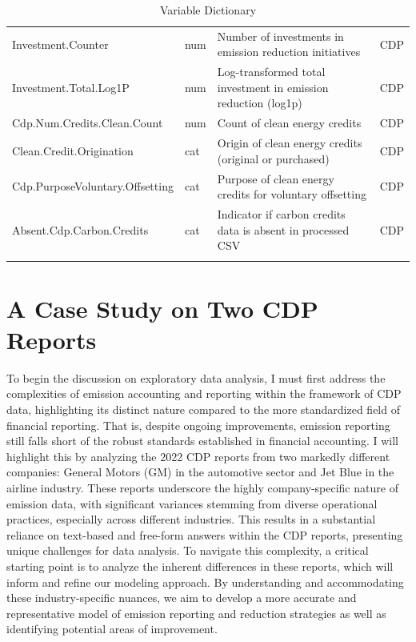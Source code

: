 \begin{longtable}{lp{1cm}p{6cm}p{1.1cm}}
    Investment.Counter & num & Number of investments in emission reduction initiatives & CDP \\
    Investment.Total.Log1P & num & Log-transformed total investment in emission reduction (log1p) & CDP \\
    Cdp.Num.Credits.Clean.Count & num & Count of clean energy credits & CDP \\
    Clean.Credit.Origination & cat & Origin of clean energy credits (original or purchased) & CDP \\
    Cdp.PurposeVoluntary.Offsetting & cat & Purpose of clean energy credits for voluntary offsetting & CDP \\
    Absent.Cdp.Carbon.Credits & cat & Indicator if carbon credits data is absent in processed CSV & CDP \\
    \bottomrule
\caption{Variable Dictionary}
\label{tab:variable-dictionary}
\end{longtable}

\section{A Case Study on Two CDP Reports}

\noindent To begin the discussion on exploratory data analysis, I must first address the complexities of emission accounting and reporting within the framework of CDP data, highlighting its distinct nature compared to the more standardized field of financial reporting. That is, despite ongoing improvements, emission reporting still falls short of the robust standards established in financial accounting. I will highlight this by analyzing the 2022 CDP reports from two markedly different companies: General Motors (GM) in the automotive sector and Jet Blue in the airline industry. These reports underscore the highly company-specific nature of emission data, with significant variances stemming from diverse operational practices, especially across different industries. This results in a substantial reliance on text-based and free-form answers within the CDP reports, presenting unique challenges for data analysis. To navigate this complexity, a critical starting point is to analyze the inherent differences in these reports, which will inform and refine our modeling approach. By understanding and accommodating these industry-specific nuances, we aim to develop a more accurate and representative model of emission reporting and reduction strategies as well as identifying potential areas of improvement. 

